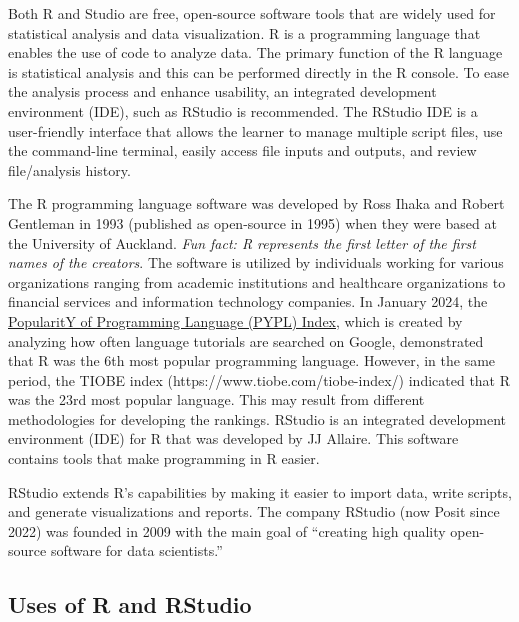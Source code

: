 \documentclass[
  letterpaper,
  DIV=11,
  numbers=noendperiod]{scrreprt}
\begin{document}
Both R and Studio are free, open-source software tools that are widely
used for statistical analysis and data visualization. R is a programming
language that enables the use of code to analyze data. The primary
function of the R language is statistical analysis and this can be
performed directly in the R console. To ease the analysis process and
enhance usability, an integrated development environment (IDE), such as
RStudio is recommended. The RStudio IDE is a user-friendly interface
that allows the learner to manage multiple script files, use the
command-line terminal, easily access file inputs and outputs, and review
file/analysis history.

The R programming language software was developed by Ross Ihaka and
Robert Gentleman in 1993 (published as open-source in 1995) when they
were based at the University of Auckland. \emph{Fun fact: R represents
the first letter of the first names of the creators}. The software is
utilized by individuals working for various organizations ranging from
academic institutions and healthcare organizations to financial services
and information technology companies. In January 2024, the
\href{https://pypl.github.io/PYPL.html}{PopularitY of Programming
Language (PYPL) Index}, which is created by analyzing how often language
tutorials are searched on Google, demonstrated that R was the 6th most
popular programming language. However, in the same period, the TIOBE
index (https://www.tiobe.com/tiobe-index/) indicated that R was the 23rd
most popular language. This may result from different methodologies for
developing the rankings. RStudio is an integrated development
environment (IDE) for R that was developed by JJ Allaire. This software
contains tools that make programming in R easier.

RStudio extends R's capabilities by making it easier to import data,
write scripts, and generate visualizations and reports. The company
RStudio (now Posit since 2022) was founded in 2009 with the main goal of
``creating high quality open-source software for data scientists.''

\hypertarget{uses-of-r-and-rstudio}{%
\subsection{Uses of R and RStudio}\label{uses-of-r-and-rstudio}}
\end{document}
